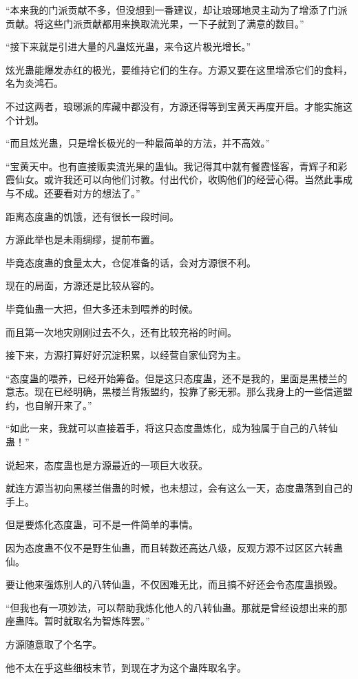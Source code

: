 \begin{this_body}
“本来我的门派贡献不多，但没想到一番建议，却让琅琊地灵主动为了增添了门派贡献。将这些门派贡献都用来换取流光果，一下子就到了满意的数目。”

“接下来就是引进大量的凡蛊炫光蛊，来令这片极光增长。”

炫光蛊能爆发赤红的极光，要维持它们的生存。方源又要在这里增添它们的食料，名为炎鸿石。

不过这两者，琅琊派的库藏中都没有，方源还得等到宝黄天再度开启。才能实施这个计划。

“而且炫光蛊，只是增长极光的一种最简单的方法，并不高效。”

“宝黄天中。也有直接贩卖流光果的蛊仙。我记得其中就有餐霞怪客，青辉子和彩霞仙女。或许我还可以向他们讨教。付出代价，收购他们的经营心得。当然此事成与不成。还要看对方的想法了。”

距离态度蛊的饥饿，还有很长一段时间。

方源此举也是未雨绸缪，提前布置。

毕竟态度蛊的食量太大，仓促准备的话，会对方源很不利。

现在的局面，方源还是比较从容的。

毕竟仙蛊一大把，但大多还未到喂养的时候。

而且第一次地灾刚刚过去不久，还有比较充裕的时间。

接下来，方源打算好好沉淀积累，以经营自家仙窍为主。

“态度蛊的喂养，已经开始筹备。但是这只态度蛊，还不是我的，里面是黑楼兰的意志。现在已经明确，黑楼兰背叛盟约，投靠了影无邪。那么我身上的一些信道盟约，也自解开来了。”

“如此一来，我就可以直接着手，将这只态度蛊炼化，成为独属于自己的八转仙蛊！”

说起来，态度蛊也是方源最近的一项巨大收获。

就连方源当初向黑楼兰借蛊的时候，也未想过，会有这么一天，态度蛊落到自己的手上。

但是要炼化态度蛊，可不是一件简单的事情。

因为态度蛊不仅不是野生仙蛊，而且转数还高达八级，反观方源不过区区六转蛊仙。

要让他来强炼别人的八转仙蛊，不仅困难无比，而且搞不好还会令态度蛊损毁。

“但我也有一项妙法，可以帮助我炼化他人的八转仙蛊。那就是曾经设想出来的那座蛊阵。暂时就取名为智炼阵罢。”

方源随意取了个名字。

他不太在乎这些细枝末节，到现在才为这个蛊阵取名字。


\end{this_body}

